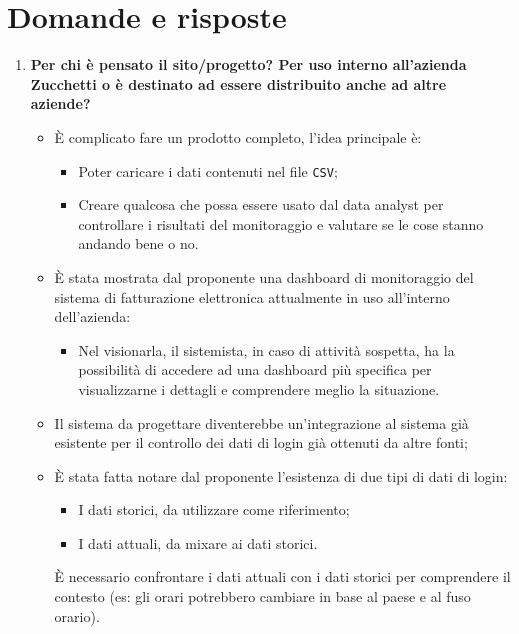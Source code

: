 \documentclass[11pt]{article}
\begin{document}
	\section{Domande e risposte}
		\begin{enumerate}
			\item \textbf{Per chi è pensato il sito/progetto? Per uso interno all'azienda Zucchetti o è destinato
			ad essere distribuito anche ad altre aziende?} 
			
			\medskip
			
			\begin{itemize}
				\item È complicato fare un prodotto completo, l'idea principale è:
				\begin{itemize}
					\item Poter caricare i dati contenuti nel file \texttt{CSV};
					\item Creare qualcosa che possa essere usato dal data analyst per controllare i risultati del monitoraggio
					e valutare se le cose stanno andando bene o no.
				\end{itemize}
				\item È stata mostrata dal proponente una dashboard di monitoraggio del sistema di fatturazione elettronica
				attualmente in uso all'interno dell'azienda:
				\begin{itemize}
					\item Nel visionarla, il sistemista, in caso di attività sospetta, ha la possibilità di accedere ad una
					dashboard più specifica	per visualizzarne i dettagli e comprendere meglio la situazione.
				\end{itemize}
				\item Il sistema da progettare diventerebbe un'integrazione al sistema già esistente per il controllo dei dati
				di login già ottenuti da altre fonti;
				\item È stata fatta notare dal proponente l'esistenza di due tipi di dati di login:
				\begin{itemize}
					\item I dati storici, da utilizzare come riferimento;
					\item I dati attuali, da mixare ai dati storici.
				\end{itemize}
				È necessario confrontare i dati attuali con i dati storici per comprendere il contesto (es: gli orari potrebbero
				cambiare in base al paese e al fuso orario).
			\end{itemize}
			

\end{enumerate}
\end{document}
